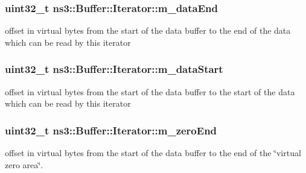 \subsubsection[{\texorpdfstring{m\+\_\+data\+End}{m_dataEnd}}]{\setlength{\rightskip}{0pt plus 5cm}uint32\+\_\+t ns3\+::\+Buffer\+::\+Iterator\+::m\+\_\+data\+End\hspace{0.3cm}{\ttfamily [private]}}\hypertarget{classns3_1_1Buffer_1_1Iterator_a0c6c677b1bbb7ee98a99dd7f40b495b8}{}\label{classns3_1_1Buffer_1_1Iterator_a0c6c677b1bbb7ee98a99dd7f40b495b8}
offset in virtual bytes from the start of the data buffer to the end of the data which can be read by this iterator 
\subsubsection[{\texorpdfstring{m\+\_\+data\+Start}{m_dataStart}}]{\setlength{\rightskip}{0pt plus 5cm}uint32\+\_\+t ns3\+::\+Buffer\+::\+Iterator\+::m\+\_\+data\+Start\hspace{0.3cm}{\ttfamily [private]}}\hypertarget{classns3_1_1Buffer_1_1Iterator_a32761e12a581576dc0567d5018b59e49}{}\label{classns3_1_1Buffer_1_1Iterator_a32761e12a581576dc0567d5018b59e49}
offset in virtual bytes from the start of the data buffer to the start of the data which can be read by this iterator 
\subsubsection[{\texorpdfstring{m\+\_\+zero\+End}{m_zeroEnd}}]{\setlength{\rightskip}{0pt plus 5cm}uint32\+\_\+t ns3\+::\+Buffer\+::\+Iterator\+::m\+\_\+zero\+End\hspace{0.3cm}{\ttfamily [private]}}\hypertarget{classns3_1_1Buffer_1_1Iterator_a556e752ebfc82c2704fae79ce36aec6f}{}\label{classns3_1_1Buffer_1_1Iterator_a556e752ebfc82c2704fae79ce36aec6f}
offset in virtual bytes from the start of the data buffer to the end of the \char`\"{}virtual zero area\char`\"{}. 
